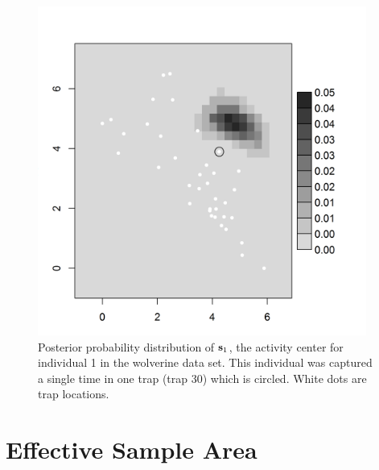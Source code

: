 {\begin{figure}[ht]
\begin{center}
\includegraphics[height=4.25in,width=4.25in]{Ch5-SCR0/figs/wolv_post_s}
\end{center}
\caption{
Posterior probability distribution of ${\bf s}_{1}$, the activity
center for individual 1 in the wolverine data set. This individual was
captured a single time in one trap (trap 30) which is circled. White
dots are trap locations.
}
\label{scr0.fig.guy1}
\end{figure}


\section{Effective Sample Area}
\label{scr0.sec.esa}

}
